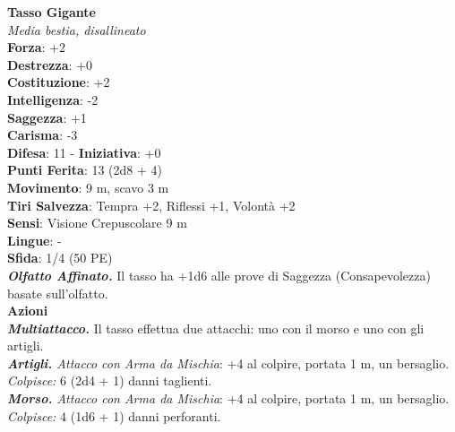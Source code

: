 \begin{multicols}{2}
\medskip\textbf{Tasso Gigante}\\
\emph{Media bestia, disallineato}\\
\textbf{Forza}: +2\\
\textbf{Destrezza}: +0\\
\textbf{Costituzione}: +2\\
\textbf{Intelligenza}: -2\\
\textbf{Saggezza}: +1\\
\textbf{Carisma}: -3\\
\textbf{Difesa}: 11 - \textbf{Iniziativa}: +0\\
\textbf{Punti Ferita}: 13 (2d8 + 4)\\
\textbf{Movimento}: 9 m, scavo 3 m\\
\textbf{Tiri Salvezza}: Tempra +2, Riflessi +1, Volontà +2\\
\textbf{Sensi}: Visione Crepuscolare 9 m \\
\textbf{Lingue}: -\\
\textbf{Sfida}: 1/4 (50 PE)\smallskip\\
\emph{\textbf{Olfatto Affinato.}} Il tasso ha +1d6 alle prove di Saggezza (Consapevolezza) basate sull'olfatto.\\
\smallskip\textbf{Azioni}\\
\emph{\textbf{Multiattacco.}} Il tasso effettua due attacchi: uno con il morso e uno con gli artigli.\\
\emph{\textbf{Artigli.} Attacco con Arma da Mischia}: +4 al colpire, portata 1 m, un bersaglio.\\
\emph{Colpisce:} 6 (2d4 + 1) danni taglienti.\\
\emph{\textbf{Morso.} Attacco con Arma da Mischia}: +4 al colpire, portata 1 m, un bersaglio.\\
\emph{Colpisce:} 4 (1d6 + 1) danni perforanti.\\


\end{multicols}
